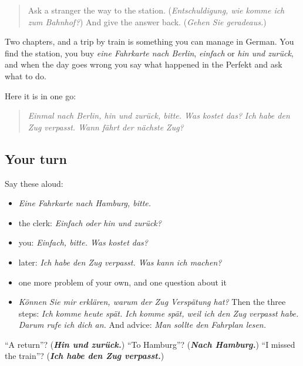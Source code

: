 \begin{quote}
Ask a stranger the way to the station. (\emph{Entschuldigung, wie komme ich zum Bahnhof?}) And give the answer back. (\emph{Gehen Sie geradeaus.})
\end{quote}

\begin{grammarlens}[title={What you've built}]
Two chapters, and a trip by train is something you can manage in German. You find the station, you buy \emph{eine Fahrkarte nach Berlin}, \emph{einfach} or \emph{hin und zurück}, and when the day goes wrong you say what happened in the Perfekt and ask what to do.

Here it is in one go:

\begin{quote}
\emph{Einmal nach Berlin, hin und zurück, bitte. Was kostet das?} \emph{Ich habe den Zug verpasst. Wann fährt der nächste Zug?}
\end{quote}
\end{grammarlens}

\subsection*{Your turn}
Say these aloud:

\begin{itemize}
\raggedright
  \item \emph{Eine Fahrkarte nach Hamburg, bitte.}
  \item the clerk: \emph{Einfach oder hin und zurück?}
  \item you: \emph{Einfach, bitte. Was kostet das?}
  \item later: \emph{Ich habe den Zug verpasst. Was kann ich machen?}
  \item one more problem of your own, and one question about it
  \item \emph{Können Sie mir erklären, warum der Zug Verspätung hat?} Then the three steps: \emph{Ich komme heute spät. Ich komme spät, weil ich den Zug verpasst habe. Darum rufe ich dich an.} And advice: \emph{Man sollte den Fahrplan lesen.}
\end{itemize}

\begin{tcolorbox}[breakable,colback=teal!4,colframe=teal!35!black,title={Before you move on}]
\textquotedblleft{}A return\textquotedblright{}? (\emph{\textbf{Hin und zurück.}}) \textquotedblleft{}To Hamburg\textquotedblright{}? (\emph{\textbf{Nach Hamburg.}}) \textquotedblleft{}I missed the train\textquotedblright{}? (\emph{\textbf{Ich habe den Zug verpasst.}})
\end{tcolorbox}
